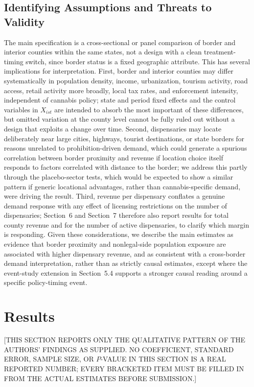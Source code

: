 \documentclass[12pt]{article}
\begin{document}
\subsection{Identifying Assumptions and Threats to Validity}
The main specification is a cross-sectional or panel comparison of border and interior counties within the
same states, not a design with a clean treatment-timing switch, since border status is a fixed geographic
attribute. This has several implications for interpretation. First, border and interior counties may differ
systematically in population density, income, urbanization, tourism activity, road access, retail activity
more broadly, local tax rates, and enforcement intensity, independent of cannabis policy; state and period
fixed effects and the control variables in $X_{ist}$ are intended to absorb the most important of these
differences, but omitted variation at the county level cannot be fully ruled out without a design that
exploits a change over time. Second, dispensaries may locate deliberately near large cities, highways,
tourist destinations, or state borders for reasons unrelated to prohibition-driven demand, which could
generate a spurious correlation between border proximity and revenue if location choice itself responds to
factors correlated with distance to the border; we address this partly through the placebo-sector tests,
which would be expected to show a similar pattern if generic locational advantages, rather than
cannabis-specific demand, were driving the result. Third, revenue per dispensary conflates a genuine demand
response with any effect of licensing restrictions on the number of dispensaries; Section~6 and Section~7
therefore also report results for total county revenue and for the number of active dispensaries, to
clarify which margin is responding. Given these considerations, we describe the main estimates as evidence
that border proximity and nonlegal-side population exposure are associated with higher dispensary revenue,
and as consistent with a cross-border demand interpretation, rather than as strictly causal estimates,
except where the event-study extension in Section~5.4 supports a stronger causal reading around a specific
policy-timing event.

\section{Results}
\label{sec:results}

[THIS SECTION REPORTS ONLY THE QUALITATIVE PATTERN OF THE AUTHORS' FINDINGS AS SUPPLIED. NO COEFFICIENT,
STANDARD ERROR, SAMPLE SIZE, OR $P$-VALUE IN THIS SECTION IS A REAL REPORTED NUMBER; EVERY BRACKETED ITEM
MUST BE FILLED IN FROM THE ACTUAL ESTIMATES BEFORE SUBMISSION.]
\end{document}
